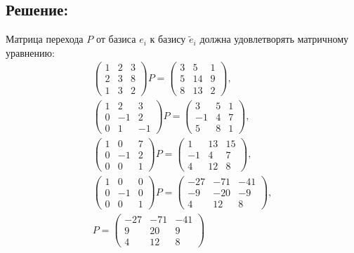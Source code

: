 \documentclass[12pt]{article}
\begin{document}
    \subsection*{Решение:}
    Матрица перехода $P$ от базиса $e_i$ к базису $\widetilde{e}_i$ должна удовлетворять матричному уравнению:
    \begin{gather*}
        \begin{pmatrix}
            1 & 2 & 3 \\
            2 & 3 & 8 \\
            1 & 3 & 2
        \end{pmatrix}
        P
        =
        \begin{pmatrix}
            3 & 5  & 1 \\
            5 & 14 & 9 \\
            8 & 13 & 2
        \end{pmatrix} , \\
        \begin{pmatrix}
            1 & 2  & 3  \\
            0 & -1 & 2  \\
            0 & 1  & -1
        \end{pmatrix}
        P
        =
        \begin{pmatrix}
            3  & 5 & 1 \\
            -1 & 4 & 7 \\
            5  & 8 & 1
        \end{pmatrix} , \\
        \begin{pmatrix}
            1 & 0  & 7 \\
            0 & -1 & 2 \\
            0 & 0  & 1
        \end{pmatrix}
        P
        =
        \begin{pmatrix}
            1  & 13 & 15 \\
            -1 & 4  & 7  \\
            4  & 12 & 8
        \end{pmatrix} , \\
        \begin{pmatrix}
            1 & 0  & 0 \\
            0 & -1 & 0 \\
            0 & 0  & 1
        \end{pmatrix}
        P
        =
        \begin{pmatrix}
            -27 & -71 & -41 \\
            -9  & -20 & -9  \\
            4   & 12  & 8
        \end{pmatrix} , \\
        P
        =
        \begin{pmatrix}
            -27 & -71 & -41 \\
            9   & 20  & 9   \\
            4   & 12  & 8
        \end{pmatrix}
    \end{gather*}
\end{document}
